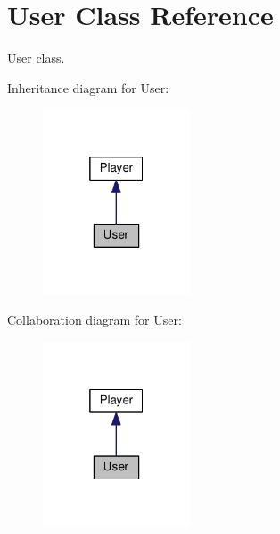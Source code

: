 \hypertarget{classUser}{}\section{User Class Reference}
\label{classUser}


\hyperlink{classUser}{User} class.  




Inheritance diagram for User\+:\nopagebreak
\begin{figure}[H]
\begin{center}
\leavevmode
\includegraphics[width=124pt]{classUser__inherit__graph}
\end{center}
\end{figure}


Collaboration diagram for User\+:\nopagebreak
\begin{figure}[H]
\begin{center}
\leavevmode
\includegraphics[width=124pt]{classUser__coll__graph}
\end{center}
\end{figure}
